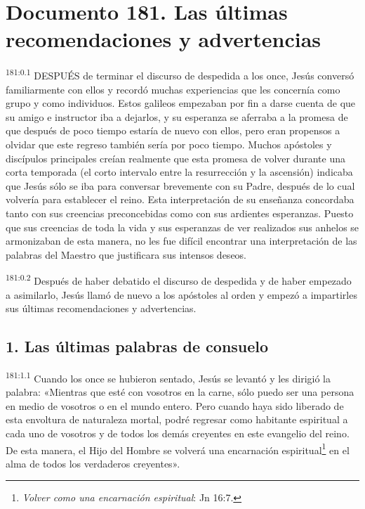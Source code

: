 \chapter{Documento 181. Las últimas recomendaciones y advertencias}
\par 
\textsuperscript{181:0.1} DESPUÉS de terminar el discurso de despedida a los once, Jesús conversó familiarmente con ellos y recordó muchas experiencias que les concernía como grupo y como individuos. Estos galileos empezaban por fin a darse cuenta de que su amigo e instructor iba a dejarlos, y su esperanza se aferraba a la promesa de que después de poco tiempo estaría de nuevo con ellos, pero eran propensos a olvidar que este regreso también sería por poco tiempo. Muchos apóstoles y discípulos principales creían realmente que esta promesa de volver durante una corta temporada (el corto intervalo entre la resurrección y la ascensión) indicaba que Jesús sólo se iba para conversar brevemente con su Padre, después de lo cual volvería para establecer el reino. Esta interpretación de su enseñanza concordaba tanto con sus creencias preconcebidas como con sus ardientes esperanzas. Puesto que sus creencias de toda la vida y sus esperanzas de ver realizados sus anhelos se armonizaban de esta manera, no les fue difícil encontrar una interpretación de las palabras del Maestro que justificara sus intensos deseos.

\par 
\textsuperscript{181:0.2} Después de haber debatido el discurso de despedida y de haber empezado a asimilarlo, Jesús llamó de nuevo a los apóstoles al orden y empezó a impartirles sus últimas recomendaciones y advertencias.

\section*{1. Las últimas palabras de consuelo}
\par 
\textsuperscript{181:1.1} Cuando los once se hubieron sentado, Jesús se levantó y les dirigió la palabra: «Mientras que esté con vosotros en la carne, sólo puedo ser una persona en medio de vosotros o en el mundo entero. Pero cuando haya sido liberado de esta envoltura de naturaleza mortal, podré regresar como habitante espiritual a cada uno de vosotros y de todos los demás creyentes en este evangelio del reino. De esta manera, el Hijo del Hombre se volverá una encarnación espiritual\footnote{\textit{Volver como una encarnación espiritual}: Jn 16:7.} en el alma de todos los verdaderos creyentes».

